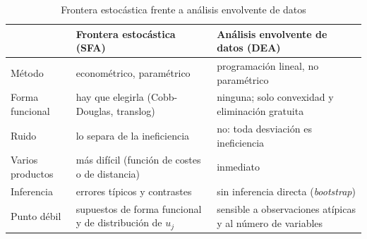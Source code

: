 \documentclass[11pt]{article}
\begin{document}
\begin{table}[H]
\centering\small
\caption{Frontera estocástica frente a análisis envolvente de datos}\label{tab:sfa-dea}
\renewcommand{\arraystretch}{1.3}
\begin{tabular}{|>{\raggedright\arraybackslash}p{}|>{\raggedright\arraybackslash}p{}|>{\raggedright\arraybackslash}p{}|}
\hline
\rowcolor{tceeazulpalido} & \textbf{Frontera estocástica (SFA)} & \textbf{Análisis envolvente de datos (DEA)}\\
\hline
Método & econométrico, paramétrico & programación lineal, no paramétrico\\
\hline
Forma funcional & hay que elegirla (Cobb-Douglas, translog) & ninguna; solo convexidad y eliminación gratuita\\
\hline
Ruido & lo separa de la ineficiencia & no: toda desviación es ineficiencia\\
\hline
Varios productos & más difícil (función de costes o de distancia) & inmediato\\
\hline
Inferencia & errores típicos y contrastes & sin inferencia directa (\emph{bootstrap})\\
\hline
Punto débil & supuestos de forma funcional y de distribución de $u_j$ & sensible a observaciones atípicas y al número de variables\\
\hline
\end{tabular}
\end{table}
\end{document}
